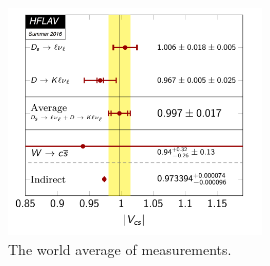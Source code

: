  \begin{figure}
    \centering
    \includegraphics[width=0.6\textwidth]{chapters/RelatedWorks/sectionVcs/figures/vcs.png}
    \caption{The world average of \absVcs measurements. }
    \label{fig:relatedWorks:vcs:measurements}
\end{figure}

